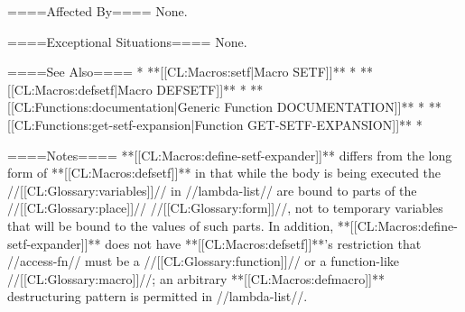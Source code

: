 ====Affected By====
None.

====Exceptional Situations====
None.

====See Also====
  * **[[CL:Macros:setf|Macro SETF]]**
  * **[[CL:Macros:defsetf|Macro DEFSETF]]**
  * **[[CL:Functions:documentation|Generic Function DOCUMENTATION]]**
  * **[[CL:Functions:get-setf-expansion|Function GET-SETF-EXPANSION]]**
  * {\secref\DocVsDecls}

====Notes====
**[[CL:Macros:define-setf-expander]]** differs from the long form of **[[CL:Macros:defsetf]]** in that while the body is being executed the //[[CL:Glossary:variables]]// in //lambda-list// are bound to parts of the //[[CL:Glossary:place]]// //[[CL:Glossary:form]]//, not to temporary variables that will be bound to the values of such parts. In addition, **[[CL:Macros:define-setf-expander]]** does not have **[[CL:Macros:defsetf]]**'s restriction that //access-fn// must be a //[[CL:Glossary:function]]// or a function-like //[[CL:Glossary:macro]]//; an arbitrary **[[CL:Macros:defmacro]]** destructuring pattern is permitted in //lambda-list//.

        
